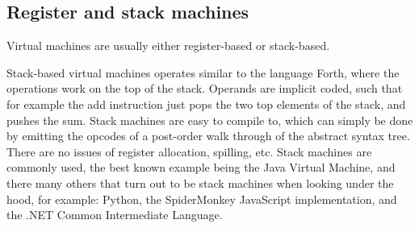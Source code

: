 \documentclass[11pt]{report}
\begin{document}






\subsection{Register and stack machines}
Virtual machines are usually either register-based or stack-based.

Stack-based virtual machines operates similar to the language Forth, where the operations work on the top of the stack. 
Operands are implicit coded, such that for example the add instruction just pops the two top elements of the stack, and pushes the sum. 
Stack machines are easy to compile to, 
which can simply be done by emitting the opcodes of a post-order walk through of the abstract syntax tree. 
There are no issues of register allocation, spilling, etc.
Stack machines are commonly used, the best known example being the Java Virtual Machine, and there many others that turn out to be stack machines when looking under the hood, for example: Python, the SpiderMonkey JavaScript implementation, and the .NET Common Intermediate Language.
\end{document}
